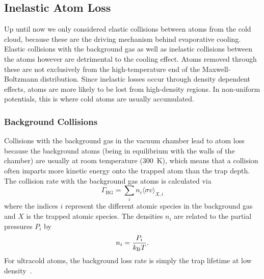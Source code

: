 
\subsection{Inelastic Atom Loss}
\label{sec:inelastic_losses}
Up until now we only considered elastic collisions between atoms from the cold cloud, because these are the driving mechanism behind evaporative cooling. Elastic collisions with the background gas as well as inelastic collisions between the atoms however are detrimental to the cooling effect. Atoms removed through these are not exclusively from the high-temperature end of the Maxwell-Boltzmann distribution. Since inelastic losses occur through density dependent effects, atoms are more likely to be lost from high-density regions. In non-uniform potentials, this is where cold atoms are usually accumulated. 

\subsubsection*{Background Collisions}
Collisions with the background gas in the vacuum chamber lead to atom loss because the background atoms (being in equilibrium with the walls of the chamber) are usually at room temperature (\SI{300}{K}), which means that a collision often imparts more kinetic energy onto the trapped atom than the trap depth. The collision rate with the background gas atoms is calculated via
\begin{equation*}
    \Gamma_\text{BG} = \sum_i n_i \langle \sigma v \rangle_{X,i} 
\end{equation*}
where the indices $i$ represent the different atomic species in the background gas and $X$ is the trapped atomic species. The densities $n_i$ are related to the partial pressures $P_i$ by
\begin{equation}
    n_i = \frac{P_i}{k_\text{B} T}. \nonumber
\end{equation}
For ultracold atoms, the background loss rate is simply the trap lifetime at low density~\cite{PhysRevLett.91.123201}.

